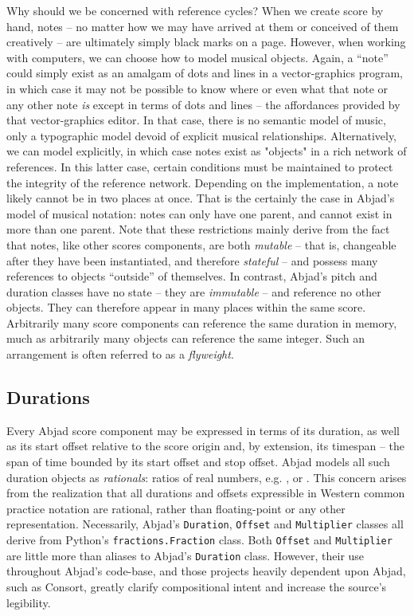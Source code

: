 \noindent Why should we be concerned with reference cycles? When we create
score by hand, notes -- no matter how we may have arrived at them or conceived
of them creatively -- are ultimately simply black marks on a page. However,
when working with computers, we can choose how to model musical objects. Again,
a \enquote{note} could simply exist as an amalgam of dots and lines in a
vector-graphics program, in which case it may not be possible to know where or
even what that note or any other note \emph{is} except in terms of dots and
lines -- the affordances provided by that vector-graphics editor. In that case,
there is no semantic model of music, only a typographic model devoid of
explicit musical relationships. Alternatively, we can model explicitly, in
which case notes exist as "objects" in a rich network of references. In this
latter case, certain conditions must be maintained to protect the integrity of
the reference network. Depending on the implementation, a note likely cannot be
in two places at once. That is the certainly the case in Abjad's model of
musical notation: notes can only have one parent, and cannot exist in more than
one parent. Note that these restrictions mainly derive from the fact that
notes, like other scores components, are both \emph{mutable} -- that is,
changeable after they have been instantiated, and therefore \emph{stateful} --
and possess many references to objects \enquote{outside} of themselves. In
contrast, Abjad's pitch and duration classes have no state -- they are
\emph{immutable} -- and reference no other objects. They can therefore appear
in many places within the same score. Arbitrarily many score components can
reference the same duration in memory, much as arbitrarily many objects can
reference the same integer. Such an arrangement is often referred to as a
\emph{flyweight}\cite{gamma1994design}.

\subsection{Durations}
\label{ssec:durations}

Every Abjad score component may be expressed in terms of its duration, as well
as its start offset relative to the score origin and, by extension, its
timespan -- the span of time bounded by its start offset and stop offset. Abjad
models all such duration objects as \emph{rationals}: ratios of real numbers,
e.g. ,  or . This concern arises from the
realization that all durations and offsets expressible in Western common
practice notation are rational, rather than floating-point or any other
representation. Necessarily, Abjad's \texttt{Duration}, \texttt{Offset} and
\texttt{Multiplier} classes all derive from Python's
\texttt{fractions.Fraction} class. Both \texttt{Offset} and \texttt{Multiplier}
are little more than aliases to Abjad's \texttt{Duration} class. However, their
use throughout Abjad's code-base, and those projects heavily dependent upon
Abjad, such as Consort, greatly clarify compositional intent and increase the
source's legibility.

